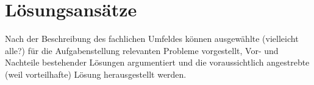 
\chapter{Lösungsansätze} %

\label{ch:Lösungsansätze} %


Nach der Beschreibung des fachlichen Umfeldes können ausgewählte (vielleicht
alle?) für die Aufgabenstellung relevanten Probleme vorgestellt, Vor- und
Nachteile bestehender Lösungen argumentiert und die voraussichtlich angestrebte
(weil vorteilhafte) Lösung herausgestellt werden.
